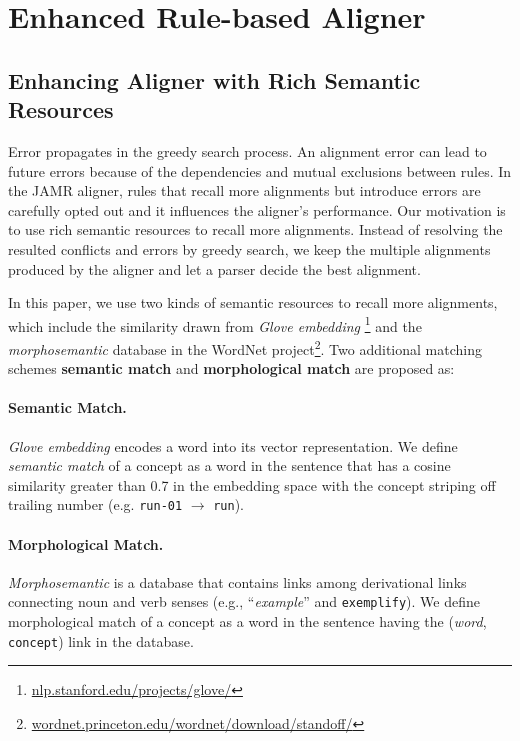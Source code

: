 \documentclass[11pt,a4paper]{article}
\begin{document}
\section{Enhanced Rule-based Aligner}\label{sec:aligner}



\subsection{Enhancing Aligner with Rich Semantic Resources}

Error propagates in the greedy search process.
An alignment error can lead to future errors because of the
dependencies and mutual exclusions between rules.
In the JAMR aligner, rules that recall more
alignments but introduce errors are carefully
opted out and it influences the aligner's performance.
Our motivation is to use rich semantic resources
to recall more alignments.
Instead of resolving the resulted conflicts and errors by greedy search,
we keep the multiple alignments produced by the aligner
and let a parser decide the best alignment.

In this paper, we use two kinds of semantic resources to recall more
alignments, which include the similarity drawn
from \textit{Glove embedding} \cite{pennington-socher-manning:2014:EMNLP2014}\footnote{\url{nlp.stanford.edu/projects/glove/}} and
the {\it morphosemantic} database \cite{10.1007/978-3-642-04235-5_30} in the WordNet project\footnote{\url{wordnet.princeton.edu/wordnet/download/standoff/}}.
Two additional matching schemes {\bf semantic match} and {\bf morphological match} are proposed as:

\paragraph{Semantic Match.} \textit{Glove embedding}
encodes a word into its vector representation.
We define \textit{semantic match} of a concept
as a word in the sentence
that has a cosine similarity greater than 0.7 in the embedding space
with the concept striping off
trailing number (e.g. {\tt run-01} $\rightarrow$ {\tt run}).

\paragraph{Morphological Match.} \textit{Morphosemantic} is a 
database that contains links among derivational links connecting
noun and verb senses (e.g., ``{\it example}'' and {\tt exemplify}).
We define morphological match of a concept as a word in the sentence 
having the ({\it word}, \texttt{concept}) link in the database.
\end{document}
